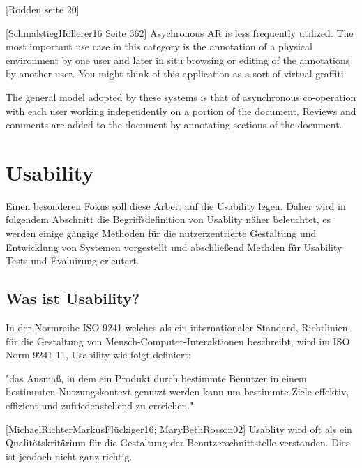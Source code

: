 [Rodden seite 20]

[SchmalstiegHöllerer16 Seite 362] Asychronous AR is less frequently utilized. The most important use case in this category is the annotation of a physical environment by one user and later in situ browsing or editing of the annotations by another user.
You might think of this application as a sort of virtual graffiti. 

The general model adopted by these systems is that of asynchronous co-operation with each user working independently on a portion of the document. Reviews and comments are added to the document by annotating sections of the document. 

\section{Usability}

Einen besonderen Fokus soll diese Arbeit auf die Usability legen. Daher wird in folgendem Abschnitt die Begriffsdefinition von Usablity näher beleuchtet, es werden einige 
gängige Methoden für die nutzerzentrierte Gestaltung und Entwicklung von Systemen vorgestellt und abschließend Methden für Usability Tests und Evaluirung erleutert. 

\subsection{Was ist Usability?}

In der Normreihe ISO 9241 welches als ein internationaler Standard, Richtlinien für die Gestaltung von Mensch-Computer-Interaktionen beschreibt, wird im ISO Norm 9241-11,  Usability wie folgt definiert:

"das Ausmaß, in dem ein Produkt durch bestimmte Benutzer in einem bestimmten Nutzungskontext genutzt werden kann um bestimmte Ziele effektiv, effizient und zufriedenstellend zu erreichen."

[MichaelRichterMarkusFlückiger16; MaryBethRosson02] Usablity wird  oft als ein Qualitätskritärium für die Gestaltung der Benutzerschnittstelle verstanden. Dies ist jeodoch nicht ganz richtig.

